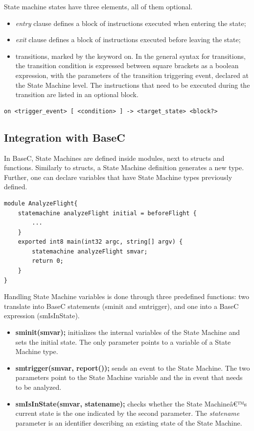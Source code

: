\documentclass[a4paper,10pt,titlepage]{report}
\begin{document}
{\setlength{\parindent}{0cm}
State machine states have three elements, all of them optional.
}
\begin{itemize}
\item \emph{entry} clause defines a block of instructions executed when entering the state;
\item \emph{exit} clause defines a block of instructions executed before leaving the state;
\item transitions, marked by the keyword on. In the general syntax for transitions, the transition condition is expressed between square brackets as a boolean expression, with the parameters of the transition triggering event, declared at the State Machine level. The instructions that need to be executed during the transition are listed in an optional block.
\end{itemize}
 
\begin{lstlisting}
on <trigger_event> [ <condition> ] -> <target_state> <block?>
\end{lstlisting}

\subsection{Integration with BaseC}
In BaseC, State Machines are defined inside modules, next to structs and functions. Similarly to structs, a State Machine definition generates a new type. Further, one can declare variables that have State Machine types previously defined.

\begin{lstlisting}
module AnalyzeFlight{
    statemachine analyzeFlight initial = beforeFlight {
        ...
    }
    exported int8 main(int32 argc, string[] argv) {	  
        statemachine analyzeFlight smvar;
        return 0;
    }	
}
\end{lstlisting}

Handling State Machine variables is done through three predefined functions: two translate into BaseC statements (sminit and smtrigger), and one into a BaseC expression (smIsInState).

\begin{itemize}
\item \textbf{sminit(smvar);} initializes the internal variables of the State Machine and sets the initial state. The only parameter points to a variable of a State Machine type.

\item \textbf{smtrigger(smvar, report());} sends an event to the State Machine. The two parameters point to the State Machine variable and the in event that needs to be analyzed.

\item \textbf{smIsInState(smvar, statename);} checks whether the State Machineâ€™s current state is the one indicated by the second parameter. The \emph{statename} parameter is an identifier describing an existing state of the State Machine.
\end{itemize}
\end{document}
